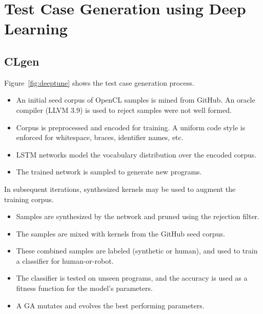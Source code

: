 \section{Test Case Generation using Deep Learning}

\subsection{CLgen}

Figure~\ref{fig:deeptune} shows the test case generation process.

\begin{itemize}
\item An initial seed corpus of OpenCL samples is mined from GitHub. An oracle compiler (LLVM 3.9) is used to reject samples were not well formed.
\item Corpus is preprocessed and encoded for training. A uniform code style is enforced for whitespace, braces, identifier names, etc.
\item LSTM networks model the vocabulary distribution over the encoded corpus.
\item The trained network is sampled to generate new programs.
\end{itemize}

\noindent In subsequent iterations, synthesized kernels may be used to augment the training corpus.

\begin{itemize}
\item Samples are synthesized by the network and pruned using the rejection filter.
\item The samples are mixed with kernels from the GitHub seed corpus.
\item These combined samples are labeled (synthetic or human), and used to train a classifier for human-or-robot.
\item The classifier is tested on unseen programs, and the accuracy is used as a fitness function for the model's parameters.
\item A GA mutates and evolves the best performing parameters.
\end{itemize}


